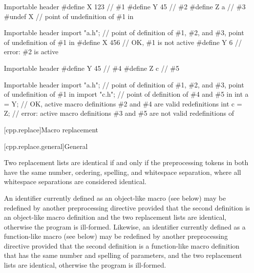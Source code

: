 \pnum
\begin{example}
\begin{codeblocktu}{Importable header }
#define X 123   // \#1
#define Y 45    // \#2
#define Z a     // \#3
#undef X        // point of undefinition of \#1 in 
\end{codeblocktu}

\begin{codeblocktu}{Importable header }
import "a.h";   // point of definition of \#1, \#2, and \#3, point of undefinition of \#1 in 
#define X 456   // OK, \#1 is not active
#define Y 6     // error: \#2 is active
\end{codeblocktu}

\begin{codeblocktu}{Importable header }
#define Y 45    // \#4
#define Z c     // \#5
\end{codeblocktu}

\begin{codeblocktu}{Importable header }
import "a.h";   // point of definition of \#1, \#2, and \#3, point of undefinition of \#1 in 
import "c.h";   // point of definition of \#4 and \#5 in 
int a = Y;      // OK, active macro definitions \#2 and \#4 are valid redefinitions
int c = Z;      // error: active macro definitions \#3 and \#5 are not valid redefinitions of 
\end{codeblocktu}
\end{example}

[cpp.replace]{Macro replacement}%

[cpp.replace.general]{General}%
%
%

\pnum
{}%
Two replacement lists are identical if and only if
the preprocessing tokens in both have
the same number, ordering, spelling, and whitespace separation,
where all whitespace separations are considered identical.

\pnum
An identifier currently defined as an
%
object-like macro (see below) may be redefined by another
preprocessing directive provided that the second definition is an
object-like macro definition and the two replacement lists
are identical, otherwise the program is ill-formed.
Likewise, an identifier currently defined as a
%
function-like macro (see below) may be redefined by another
preprocessing directive provided that the second definition is a
function-like macro definition that has the same number and spelling
of parameters,
and the two replacement lists are identical,
otherwise the program is ill-formed.

